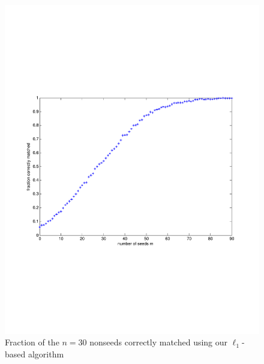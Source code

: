 \documentclass[12pt]{article}
\begin{document}
\begin{figure}
\centering
 \caption{Fraction of the $n=30$ nonseeds correctly matched using our $\ell_1$-based algorithm \label{figell1}}
    \includegraphics[width=1.2\textwidth]{n30rep65ell1}
  \end{figure}
\end{document}

